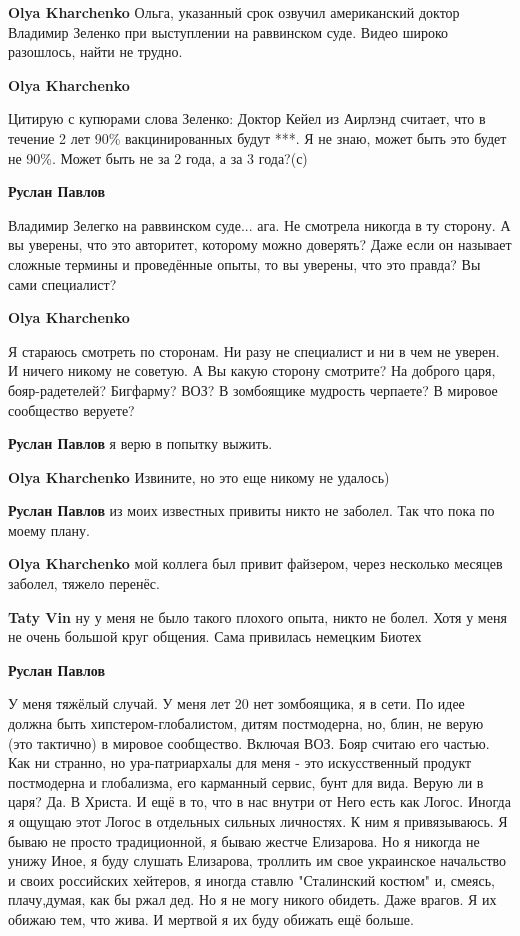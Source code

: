 \begin{itemize}
\begin{itemize}
\textbf{Olya Kharchenko} Ольга, указанный срок озвучил американский доктор Владимир Зеленко при выступлении на раввинском суде. Видео широко разошлось, найти не трудно.

\textbf{Olya Kharchenko} 

Цитирую с купюрами слова Зеленко: Доктор Кейел из Аирлэнд считает, что в
течение 2 лет 90\% вакцинированных будут ***. Я не знаю, может быть это будет не
90\%. Может быть не за 2 года, а за 3 года?(с)

\textbf{Руслан Павлов} 

Владимир Зелегко на раввинском суде... ага. Не смотрела никогда в ту сторону. А
вы уверены, что это авторитет, которому можно доверять? Даже если он называет
сложные термины и проведённые опыты, то вы уверены, что это правда? Вы сами
специалист?

\textbf{Olya Kharchenko} 

Я стараюсь смотреть по сторонам. Ни разу не специалист и ни в чем не уверен. И
ничего никому не советую. А Вы какую сторону смотрите? На доброго царя,
бояр-радетелей? Бигфарму? ВОЗ? В зомбоящике мудрость черпаете? В мировое
сообщество веруете?

\textbf{Руслан Павлов} я верю в попытку выжить.

\textbf{Olya Kharchenko} Извините, но это еще никому не удалось)

\textbf{Руслан Павлов} из моих известных привиты никто не заболел. Так что пока по моему плану.

\textbf{Olya Kharchenko} мой коллега был привит файзером, через несколько месяцев заболел, тяжело перенёс.

\textbf{Taty Vin} ну у меня не было такого плохого опыта, никто не болел. Хотя у меня не очень большой круг общения.
Сама привилась немецким Биотех

\textbf{Руслан Павлов} 

У меня тяжёлый случай. У меня лет 20 нет зомбоящика, я в сети. По идее должна
быть хипстером-глобалистом, дитям постмодерна, но, блин, не верую (это
тактично) в мировое сообщество. Включая ВОЗ. Бояр считаю его частью. Как ни
странно, но ура-патриархалы для меня - это искусственный продукт постмодерна и
глобализма, его карманный сервис, бунт для вида. Верую ли в царя? Да. В Христа.
И ещё в то, что в нас внутри от Него есть как Логос. Иногда я ощущаю этот Логос
в отдельных сильных личностях. К ним я привязываюсь. Я бываю не просто
традиционной, я бываю жестче Елизарова. Но я никогда не унижу Иное, я буду
слушать Елизарова, троллить им свое украинское начальство и своих российских
хейтеров, я иногда ставлю "Сталинский костюм" и, смеясь, плачу,думая, как бы
ржал дед. Но я не могу никого обидеть. Даже врагов. Я их обижаю тем, что жива.
И мертвой я их буду обижать ещё больше.


\end{itemize}
\end{itemize}
